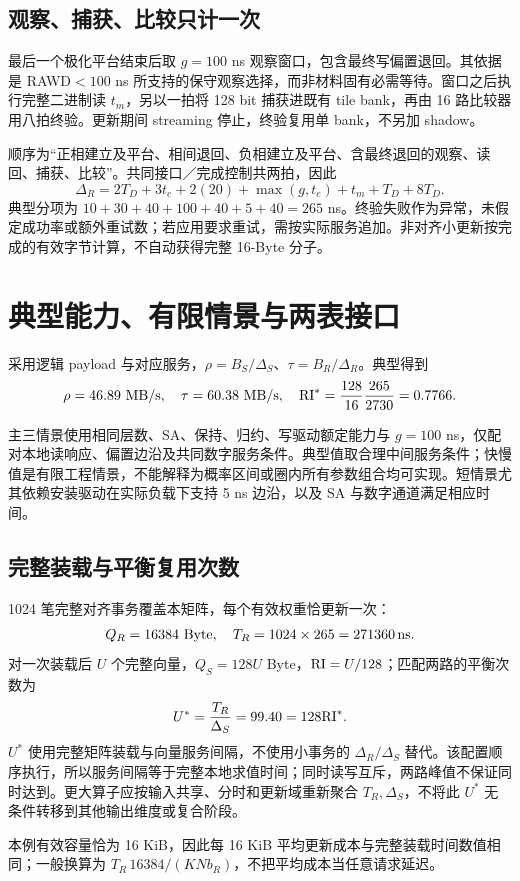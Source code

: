 \subsection{观察、捕获、比较只计一次}
最后一个极化平台结束后取 $g=100$ ns 观察窗口，包含最终写偏置退回。其依据是 RAWD$<100$ ns 所支持的保守观察选择，而非材料固有必需等待。窗口之后执行完整二进制读 $t_m$，另以一拍将 128 bit 捕获进既有 tile bank，再由 16 路比较器用八拍终验。更新期间 streaming 停止，终验复用单 bank，不另加 shadow。

顺序为“正相建立及平台、相间退回、负相建立及平台、含最终退回的观察、读回、捕获、比较”。共同接口／完成控制共两拍，因此
\[
\boxed{\Delta_R=2T_D+3t_e+2(20)+\max(g,t_e)+t_m+T_D+8T_D.}
\]
典型分项为 $10+30+40+100+40+5+40=265$ ns。终验失败作为异常，未假定成功率或额外重试数；若应用要求重试，需按实际服务追加。非对齐小更新按完成的有效字节计算，不自动获得完整 16-Byte 分子。

\clearpage
\section{典型能力、有限情景与两表接口}

采用逻辑 payload 与对应服务，$\rho=B_S/\Delta_S$、$\tau=B_R/\Delta_R$。典型得到
\[
\rho=46.89\ \mathrm{MB/s},\quad\tau=60.38\ \mathrm{MB/s},\quad
\RI^*=\frac{128}{16}\frac{265}{2730}=0.7766.
\]


主三情景使用相同层数、SA、保持、归约、写驱动额定能力与 $g=100$ ns，仅配对本地读响应、偏置边沿及共同数字服务条件。典型值取合理中间服务条件；快慢值是有限工程情景，不能解释为概率区间或圈内所有参数组合均可实现。短情景尤其依赖安装驱动在实际负载下支持 5 ns 边沿，以及 SA 与数字通道满足相应时间。

\subsection{完整装载与平衡复用次数}
1024 笔完整对齐事务覆盖本矩阵，每个有效权重恰更新一次：
\[
Q_R=16384\ \mathrm{Byte},\quad T_R=1024\times265=271360\,\mathrm{ns}.
\]
对一次装载后 $U$ 个完整向量，$Q_S=128U$ Byte，$\mathrm{RI}=U/128$；匹配两路的平衡次数为
\[
U^*=\frac{T_R}{\Delta_S}=99.40=128\mathrm{RI}^*.
\]
$U^*$ 使用完整矩阵装载与向量服务间隔，不使用小事务的 $\Delta_R/\Delta_S$ 替代。该配置顺序执行，所以服务间隔等于完整本地求值时间；同时读写互斥，两路峰值不保证同时达到。更大算子应按输入共享、分时和更新域重新聚合 $T_R,\Delta_S$，不将此 $U^*$ 无条件转移到其他输出维度或复合阶段。

本例有效容量恰为 16 KiB，因此每 16 KiB 平均更新成本与完整装载时间数值相同；一般换算为 $T_R\,16384/(KNb_R)$，不把平均成本当任意请求延迟。

